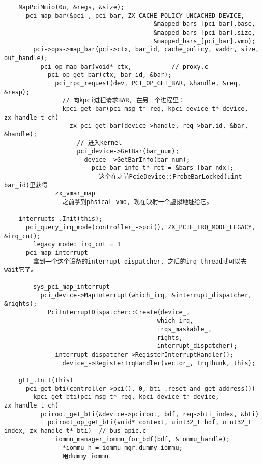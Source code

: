 \begin{verbatim}
    MapPciMmio(0u, &regs, &size);
      pci_map_bar(&pci_, pci_bar, ZX_CACHE_POLICY_UNCACHED_DEVICE,
                                         &mapped_bars_[pci_bar].base,
                                         &mapped_bars_[pci_bar].size,
                                         &mapped_bars_[pci_bar].vmo);
        pci->ops->map_bar(pci->ctx, bar_id, cache_policy, vaddr, size, out_handle);
          pci_op_map_bar(void* ctx,           // proxy.c   
            pci_op_get_bar(ctx, bar_id, &bar);        
              pci_rpc_request(dev, PCI_OP_GET_BAR, &handle, &req, &resp);
                // 向kpci进程请求BAR, 在另一个进程里：
                kpci_get_bar(pci_msg_t* req, kpci_device_t* device, zx_handle_t ch)
                  zx_pci_get_bar(device->handle, req->bar.id, &bar, &handle);
                    // 进入kernel
                    pci_device->GetBar(bar_num);
                      device_->GetBarInfo(bar_num);
                        pcie_bar_info_t* ret = &bars_[bar_ndx];  
                          这个在之前PcieDevice::ProbeBarLocked(uint bar_id)里获得
              zx_vmar_map
                之前拿到phsical vmo, 现在映射一个虚拟地址给它。

    interrupts_.Init(this);
      pci_query_irq_mode(controller_->pci(), ZX_PCIE_IRQ_MODE_LEGACY, &irq_cnt);
        legacy mode: irq_cnt = 1
      pci_map_interrupt
        拿到一个这个设备的interrupt dispatcher, 之后的irq thread就可以去wait它了。

        sys_pci_map_interrupt
          pci_device->MapInterrupt(which_irq, &interrupt_dispatcher, &rights);
            PciInterruptDispatcher::Create(device_,
                                          which_irq,
                                          irqs_maskable_,
                                          rights,
                                          interrupt_dispatcher);
              interrupt_dispatcher->RegisterInterruptHandler();
                device_->RegisterIrqHandler(vector_, IrqThunk, this);                    

    gtt_.Init(this)
      pci_get_bti(controller->pci(), 0, bti_.reset_and_get_address())
        kpci_get_bti(pci_msg_t* req, kpci_device_t* device, zx_handle_t ch)
          pciroot_get_bti(&device->pciroot, bdf, req->bti_index, &bti)
            pciroot_op_get_bti(void* context, uint32_t bdf, uint32_t index, zx_handle_t* bti)  // bus-apic.c
              iommu_manager_iommu_for_bdf(bdf, &iommu_handle);
                *iommu_h = iommu_mgr.dummy_iommu;
                用dummy iommu


\end{verbatim}
